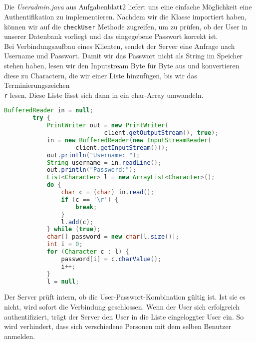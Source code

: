 \documentclass{scrartcl}
\begin{document}
    \subsection{}
    \label{sub:5.4}
      Die \textit{Useradmin.java} aus Aufgabenblatt2 liefert uns eine einfache
      Möglichkeit eine Authentifikation zu implementieren. Nachdem wir die
      Klasse importiert haben, können wir auf die \texttt{checkUser} Methode
      zugreifen, um zu prüfen, ob der User in unserer Datenbank vorliegt und
      das eingegebene Passwort korrekt ist.\\
      Bei Verbindungsaufbau eines Klienten, sendet der Server eine Anfrage nach
      Username und Passwort. Damit wir das Passwort nicht als String im
      Speicher stehen haben, lesen wir den Inputstream Byte für Byte aus und
      konvertieren diese zu Charactern, die wir einer Liste hinzufügen, bis wir
      das Terminierungszeichen \texttt{\\r} lesen. Diese Liste lässt sich dann
      in ein char-Array umwandeln.
      \begin{lstlisting}[language=java]
        BufferedReader in = null;
		try {
			PrintWriter out = new PrintWriter(
                            client.getOutputStream(), true);
			in = new BufferedReader(new InputStreamReader(
					client.getInputStream()));
			out.println("Username: ");
			String username = in.readLine();
			out.println("Password:");
			List<Character> l = new ArrayList<Character>();
			do {
				char c = (char) in.read();
				if (c == '\r') {
					break;
				}
				l.add(c);
			} while (true);
			char[] password = new char[l.size()];
			int i = 0;
			for (Character c : l) {
				password[i] = c.charValue();
				i++;
			}
			l = null;
      \end{lstlisting}
      Der Server prüft intern, ob die User-Passwort-Kombination gültig ist.
      Ist sie es nicht, wird sofort die Verbindung geschlossen. Wenn der User
      sich erfolgreich authentifiziert, trägt der Server den User in die Liste
      eingeloggter User ein. So wird verhindert, dass sich verschiedene Personen
      mit dem selben Benutzer anmelden.
\end{document}
